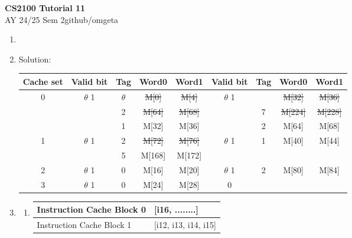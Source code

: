 \documentclass[12pt, a4paper]{article}
\newcommand{\mytitle}{CS2100 Tutorial 11}
\newcommand{\myauthor}{github/omgeta}
\newcommand{\mydate}{AY 24/25 Sem 2}
\begin{document}
\raggedright
\footnotesize
\begin{center}
{\normalsize{\textbf{\mytitle}}} \\
{\footnotesize{\mydate\hspace{2pt}\textemdash\hspace{2pt}\myauthor}}
\end{center}
\begin{enumerate}[Q\arabic*.]
  \item

  \item Solution:\\ 
    \begin{tabular}{|c|c c c c|c c c c|}
      \hline
      \textbf{Cache set} & \textbf{Valid bit} & \textbf{Tag} & \textbf{Word0} & \textbf{Word1} & \textbf{Valid bit} & \textbf{Tag} & \textbf{Word0} & \textbf{Word1} \\
      \hline
      0 & $\theta$ 1 & $\theta$ & \st{M[0]} & \st{M[4]} & $\theta$ 1 & & \st{M[32]} & \st{M[36]} \\
        &            & 2        & \st{M[64]} & \st{M[68]} &             & 7        & \st{M[224]} & \st{M[228]} \\
        &            & 1        & M[32]       & M[36]       &             & 2        & M[64]        & M[68] \\
      \hline
      1 & $\theta$ 1 & 2        & \st{M[72]} & \st{M[76]} & $\theta$ 1 & 1        & M[40]        & M[44] \\
        &            & 5        & M[168]      & M[172]      &             &          &              &      \\
      \hline
      2 & $\theta$ 1 & 0        & M[16]       & M[20]       & $\theta$ 1 & 2        & M[80]        & M[84] \\
      \hline
      3 & $\theta$ 1 & 0        & M[24]       & M[28]       & 0          &          &              &      \\
      \hline
    \end{tabular}

  \item 
    \begin{enumerate}[(\alph*.)]
      \item 
        \begin{tabular}{|l|l|}
        \hline
        Instruction Cache Block 0 & [i16, ........] \\
        \hline
        Instruction Cache Block 1 & [i12, i13, i14, i15] \\
        \hline
        \end{tabular}


\end{enumerate}
\end{enumerate}
\end{document}
